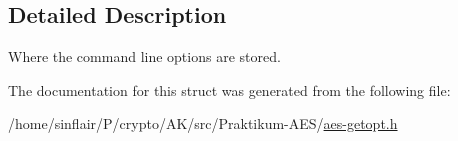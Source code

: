 \subsection{Detailed Description}
Where the command line options are stored. 

The documentation for this struct was generated from the following file\+:\begin{DoxyCompactItemize}
\item 
/home/sinflair/\+P/crypto/\+A\+K/src/\+Praktikum-\/\+A\+E\+S/\hyperlink{aes-getopt_8h}{aes-\/getopt.\+h}\end{DoxyCompactItemize}
